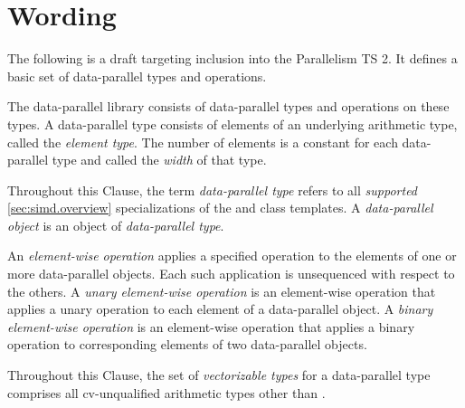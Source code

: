 \section{Wording}

The following is a draft targeting inclusion into the Parallelism TS 2.
It defines a basic set of data-parallel types and operations.

\newcommand\clause{Clause\xspace}
\newcommand\width{width\xspace}

\begin{wgText}
  \setcounter{WGClause}{7}
  \pnum
  The data-parallel library consists of data-parallel types and operations on these types.
  A data-parallel type consists of elements of an underlying arithmetic type, called the \emph{element type}.
  The number of elements is a constant for each data-parallel type and called the \emph{\width} of that type.

  \pnum
  Throughout this \clause, the term \emph{data-parallel type} refers to all \emph{supported} \ref{sec:simd.overview} specializations of the \simd and \mask class templates.
  A \emph{data-parallel object} is an object of \emph{data-parallel type}.

  \pnum
  An \emph{element-wise operation} applies a specified operation to the elements of one or more data-parallel objects.
  Each such application is unsequenced with respect to the others.
  A \emph{unary element-wise operation} is an element-wise operation that applies a unary operation to each element of a data-parallel object.
  A \emph{binary element-wise operation} is an element-wise operation that applies a binary operation to corresponding elements of two data-parallel objects.

  \pnum Throughout this \clause, the set of \emph{vectorizable types} for a data-parallel type comprises all cv-unqualified arithmetic types other than \bool.

  \pnum \label{cl:intent-note}

  
  
  
\end{wgText}

